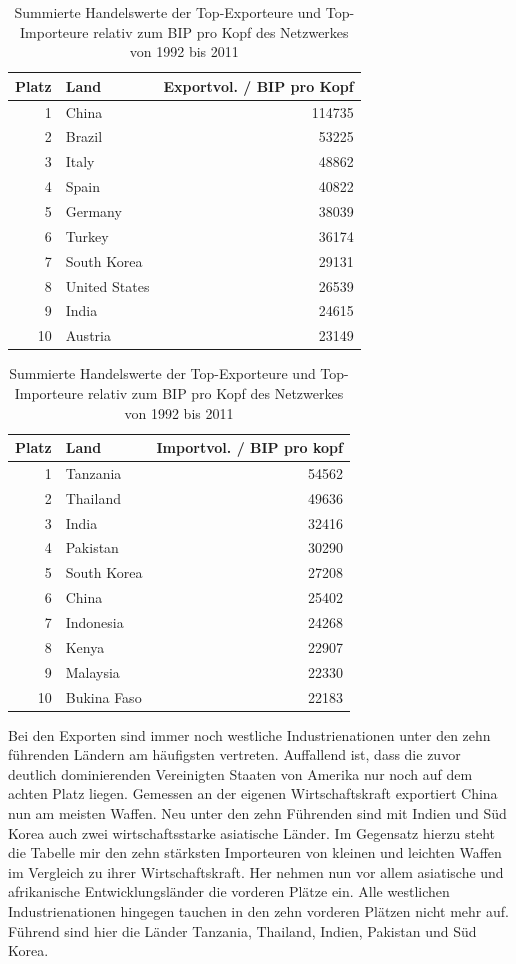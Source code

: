\documentclass[a4paper,ngerman,oneside,titlepage,bibliography=totoc,11pt]{scrreprt}
\begin{document}
	\begin{table}[ht]

\centering

\begin{minipage}[t]{0.45\textwidth}
\footnotesize
\centering
\begin{tabular}{rlr}
  \hline
 Platz & Land & Exportvol. / BIP pro Kopf\\ 
  \hline
1 & China & 114735 \\
2 & Brazil & 53225 \\
3 & Italy & 48862 \\
4 & Spain & 40822 \\
5 & Germany & 38039 \\ 
6 & Turkey & 36174 \\
7 & South Korea & 29131 \\
8 & United States & 26539 \\
9 & India & 24615 \\
10 & Austria & 23149 \\
   \hline
	\end{tabular}
	\end{minipage}	
\hfill	
\begin{minipage}[t]{0.45\textwidth}	
\centering
\footnotesize
\begin{tabular}{rlr}
  \hline
 Platz & Land & Importvol. / BIP pro kopf\\ 
  \hline
1 &Tanzania &54562 \\
2 &Thailand &49636\\
3 &India &32416\\
4 &Pakistan &30290\\
5 &South Korea &27208\\
6 &China &25402\\
7 &Indonesia &24268\\
8 &Kenya &22907\\
9 &Malaysia &22330\\
10 &Bukina Faso &22183\\
   \hline
\end{tabular}
\end{minipage}
\caption{Summierte Handelswerte der Top-Exporteure und Top-Importeure relativ zum BIP pro Kopf des Netzwerkes von 1992 bis 2011}
\label{tab:tops2}
\end{table} 
Bei den Exporten sind immer noch westliche Industrienationen unter den zehn führenden Ländern am häufigsten vertreten. Auffallend ist, dass die zuvor deutlich dominierenden Vereinigten Staaten von Amerika nur noch auf dem achten Platz liegen. Gemessen an der eigenen Wirtschaftskraft exportiert China nun am meisten Waffen. Neu unter den zehn Führenden sind mit Indien und Süd Korea auch zwei wirtschaftsstarke asiatische Länder.
Im Gegensatz hierzu steht die Tabelle mir den zehn stärksten Importeuren von kleinen und leichten Waffen im Vergleich zu ihrer Wirtschaftskraft. Her nehmen nun vor allem asiatische und afrikanische Entwicklungsländer die vorderen Plätze ein. Alle westlichen Industrienationen hingegen tauchen in den zehn vorderen Plätzen nicht mehr auf. Führend sind hier die Länder Tanzania, Thailand, Indien, Pakistan und Süd Korea.
\end{document}
